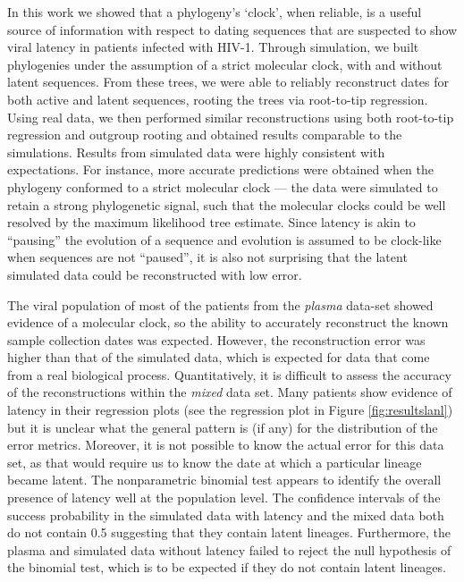 \documentclass[12pt]{article}
\begin{document}
In this work we showed that a phylogeny's `clock', when reliable, is a useful source of information with respect to dating sequences that are suspected to show viral latency in patients infected with HIV-1. 
Through simulation, we built phylogenies under the assumption of a strict molecular clock, with and without latent sequences.
From these trees, we were able to reliably reconstruct dates for both active and latent sequences, rooting the trees via root-to-tip regression.
Using real data, we then performed similar reconstructions using both root-to-tip regression and outgroup rooting and obtained results comparable to the simulations.
Results from simulated data were highly consistent with expectations. 
For instance, more accurate predictions were obtained when the phylogeny conformed to a strict molecular clock --- the data were simulated to retain a strong phylogenetic signal, such that the molecular clocks could be well resolved by the maximum likelihood tree estimate. 
Since latency is akin to ``pausing'' the evolution of a sequence and evolution is assumed to be clock-like when sequences are not ``paused'', it is also not surprising that the latent simulated data could be reconstructed with low error. 

The viral population of most of the patients from the {\em plasma} data-set showed evidence of a molecular clock, so the ability to accurately reconstruct the known sample collection dates was expected.
However, the reconstruction error was higher than that of the simulated data, which is expected for data that come from a real biological process.
Quantitatively, it is difficult to assess the accuracy of the reconstructions within the {\em mixed} data set. 
Many patients show evidence of latency in their regression plots (see the regression plot in Figure \ref{fig:resultslanl}) but it is unclear what the general pattern is (if any) for the distribution of the error metrics. 
Moreover, it is not possible to know the actual error for this data set, as that would require us to know the date at which a particular lineage became latent. 
The nonparametric binomial test appears to identify the overall presence of latency well at the population level.
The confidence intervals of the success probability in the simulated data with latency and the mixed data both do not contain 0.5 suggesting that they contain latent lineages.
Furthermore, the plasma and simulated data without latency failed to reject the null hypothesis of the binomial test, which is to be expected if they do not contain latent lineages.
\end{document}
